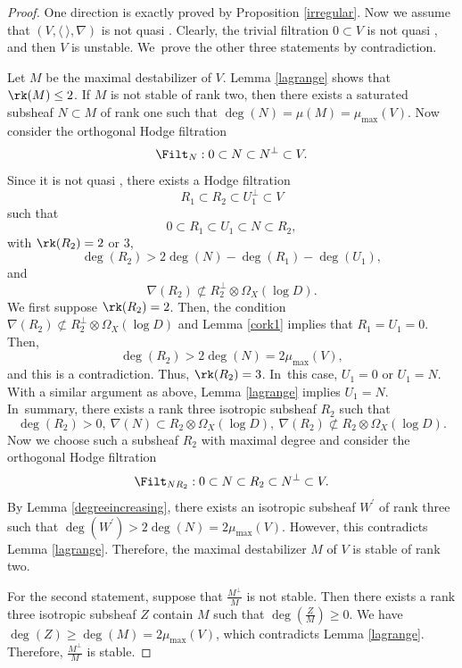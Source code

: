 \begin{proof}
One direction is exactly proved by Proposition \ref{irregular}. Now we assume that $(V,\langle \ \rangle,\nabla)$ is not quasi \grsemistable. Clearly, the trivial filtration $0 \subset V$ is not quasi \grsemistable, and then $V$ is unstable. We~prove the other three statements by contradiction.

Let $M$ be the maximal destabilizer of $V$. Lemma \ref{lagrange} shows that $\rk(M) \leq 2$. If $M$ is not stable of rank two, then there exists a saturated subsheaf $N \subset M$ of rank one such that $\deg(N)=\mu(M)=\mu_{\max}(V)$. Now consider the orthogonal Hodge filtration
\[
\Filt_{N}:0\subset N\subset N^\perp\subset V.
\]
Since it is not quasi \grsemistable, there exists a Hodge filtration
\[
R_1\subset R_2\subset U_1^\perp\subset V
\]
such that
\[
0\subset R_1\subset U_1\subset N \subset R_2,
\]
with $\rk(R_2)=2$ or $3$,
\[
\deg(R_2)>2\deg(N)-\deg(R_1)-\deg(U_1),
\]
and
\[
\nabla(R_2)\not\subset R_2^\perp\otimes\Omega_X(\log D).
\]
We first suppose $\rk(R_2)=2$. Then, the condition $\nabla(R_2)\not\subset R_2^\perp\otimes\Omega_X(\log D)$ and Lemma \ref{cork1} implies that $R_1 = U_1 = 0$. Then,
\[
\deg(R_2)>2\deg(N)=2\mu_{\max}(V),
\]
and this is a contradiction. Thus, $\rk(R_2)=3$. In~this case, $U_1=0$ or $U_1 = N$. With a similar argument as above, Lemma \ref{lagrange} implies $U_1=N$. In~summary, there exists a rank three isotropic subsheaf $R_2$ such that
\[
\deg(R_2)>0,\ \nabla(N)\subset R_2 \otimes \Omega_X(\log D),\ \nabla(R_2)\not\subset R_2 \otimes \Omega_X(\log D).
\]
Now we choose such a subsheaf $R_2$ with maximal degree and consider the orthogonal Hodge filtration
\[
\Filt_{NR_2}:0\subset N\subset R_2\subset N^\perp \subset V.
\]
By Lemma \ref{degreeincreasing}, there exists an isotropic subsheaf $W^\prime$ of rank three such that $\deg(W^\prime)>2\deg(N)=2\mu_{\max}(V)$. However, this contradicts Lemma \ref{lagrange}. Therefore, the maximal destabilizer $M$ of $V$ is stable of rank two.

For the second statement, suppose that $\frac{M^\perp}{M}$ is not stable. Then there exists a rank three isotropic subsheaf $Z$ contain $M$ such that $\deg(\frac{Z}{M})\geq 0$. We have $\deg(Z)\geq \deg(M)=2\mu_{\max}(V)$, which contradicts Lemma \ref{lagrange}. Therefore, $\frac{M^\perp}{M}$ is stable.


\end{proof}
